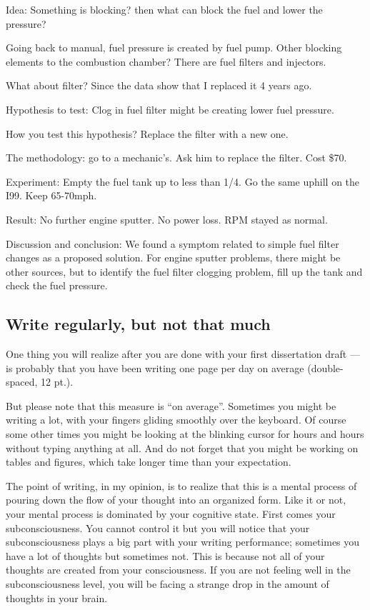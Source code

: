 \documentclass[11pt]{article}
\begin{document}
Idea: Something is blocking? then what can block the fuel and lower the
pressure? 

Going back to manual, fuel pressure is created by fuel pump. Other blocking
elements to the combustion chamber? There are fuel filters and injectors.

What about filter? Since the data show that I replaced it 4 years ago.

Hypothesis to test: Clog in fuel filter might be creating lower fuel pressure.

How you test this hypothesis? Replace the filter with a new one.

The methodology: go to a mechanic's. Ask him to replace the filter. Cost \$70.

Experiment: Empty the fuel tank up to less than 1/4. Go the same uphill on the
I99. Keep 65-70mph.

Result: No further engine sputter. No power loss. RPM stayed as normal.

Discussion and conclusion: We found a symptom related to simple fuel filter
changes as a proposed solution. For engine sputter problems, there might be
other sources, but to identify the fuel filter clogging problem, fill up the
tank and check the fuel pressure.



\subsection{Write regularly, but not that much}
One thing you will realize after you are done with your first dissertation
draft --- is probably that you have been writing one page per day on average
(double-spaced, 12 pt.).

But please note that this measure is ``on average''. Sometimes you might be
writing a lot, with your fingers gliding smoothly over the keyboard. Of
course some other times you might be looking at the blinking cursor for hours
and hours without typing anything at all. And do not forget that you might be
working on tables and figures, which take longer time than your expectation.

The point of writing, in my opinion, is to realize that this is a mental
process of pouring down the flow of your thought into an organized form. Like
it or not, your mental process is dominated by your cognitive state. First
comes your subconsciousness. You cannot control it but you will notice
that your subconsciousness plays a big part with your writing performance;
sometimes you have a lot of thoughts but sometimes not. This is because not
all of your thoughts are created from your consciousness. If you are not
feeling well in the subconsciousness level, you will be facing a strange
drop in the amount of thoughts in your brain.
\end{document}
